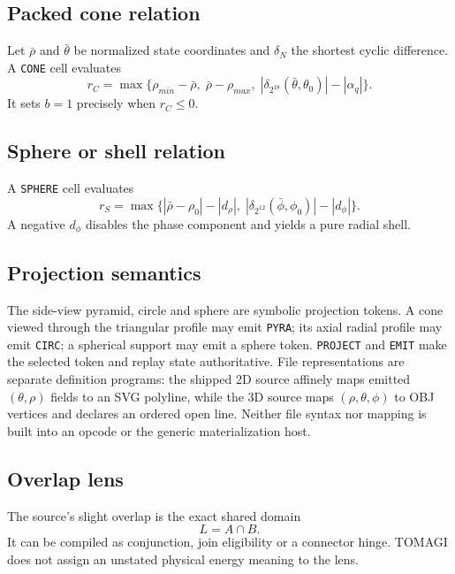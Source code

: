 \documentclass[11pt,a4paper]{article}
\newcommand{\code}[1]{\texttt{#1}}
\begin{document}
\subsection{Packed cone relation}
Let $\bar\rho$ and $\bar\theta$ be normalized state coordinates and $\delta_N$ the shortest cyclic difference. A \code{CONE} cell evaluates
\begin{equation}
r_C=\max\{\rho_{min}-\bar\rho,\;\bar\rho-\rho_{max},\;|\delta_{2^{18}}(\bar\theta,\theta_0)|-|\alpha_q|\}.
\end{equation}
It sets $b=1$ precisely when $r_C\le0$.

\subsection{Sphere or shell relation}
A \code{SPHERE} cell evaluates
\begin{equation}
r_S=\max\{|\bar\rho-\rho_0|-|d_\rho|,\;|\delta_{2^{12}}(\bar\phi,\phi_0)|-|d_\phi|\}.
\end{equation}
A negative $d_\phi$ disables the phase component and yields a pure radial shell.

\subsection{Projection semantics}
The side-view pyramid, circle and sphere are symbolic projection tokens. A cone viewed through the triangular profile may emit \code{PYRA}; its axial radial profile may emit \code{CIRC}; a spherical support may emit a sphere token. \code{PROJECT} and \code{EMIT} make the selected token and replay state authoritative. File representations are separate definition programs: the shipped 2D source affinely maps emitted $(\theta,\rho)$ fields to an SVG polyline, while the 3D source maps $(\rho,\theta,\phi)$ to OBJ vertices and declares an ordered open line. Neither file syntax nor mapping is built into an opcode or the generic materialization host.

\subsection{Overlap lens}
The source's slight overlap is the exact shared domain
\begin{equation}
L=A\cap B.
\end{equation}
It can be compiled as conjunction, join eligibility or a connector hinge. TOMAGI does not assign an unstated physical energy meaning to the lens.
\end{document}
